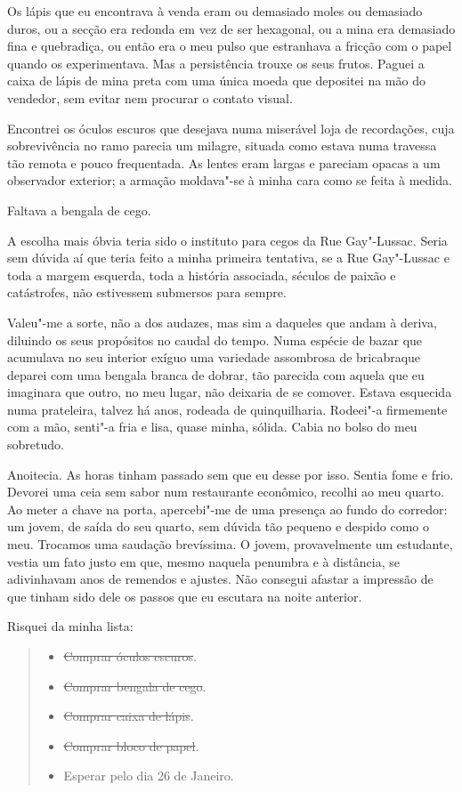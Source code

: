 Os lápis que eu encontrava à venda eram ou demasiado moles ou demasiado
duros, ou a secção era redonda em vez de ser hexagonal, ou a mina era
demasiado fina e quebradiça, ou então era o meu pulso que estranhava a
fricção com o papel quando os experimentava. Mas a persistência trouxe
os seus frutos. Paguei a caixa de lápis de mina preta com uma única
moeda que depositei na mão do vendedor, sem evitar nem procurar o
contato visual.

Encontrei os óculos escuros que desejava numa miserável loja de
recordações, cuja sobrevivência no ramo parecia um milagre, situada como
estava numa travessa tão remota e pouco frequentada. As lentes eram
largas e pareciam opacas a um observador exterior; a armação moldava"-se
à minha cara como se feita à medida.

Faltava a bengala de cego.

A escolha mais óbvia teria sido o instituto para cegos da Rue
Gay"-Lussac. Seria sem dúvida aí que teria feito a minha primeira
tentativa, se a Rue Gay"-Lussac e toda a margem esquerda, toda a história
associada, séculos de paixão e catástrofes, não estivessem submersos
para sempre.

Valeu"-me a sorte, não a dos audazes, mas sim a daqueles que andam à
deriva, diluindo os seus propósitos no caudal do tempo. Numa espécie de
bazar que acumulava no seu interior exíguo uma variedade assombrosa de
bricabraque deparei com uma bengala branca de dobrar, tão parecida com
aquela
que eu imaginara que outro, no meu lugar, não deixaria de se comover.
Estava esquecida numa prateleira, talvez há anos, rodeada de
quinquilharia. Rodeei"-a firmemente com a mão, senti"-a fria e lisa, quase
minha, sólida. Cabia no bolso do meu sobretudo.

Anoitecia. As horas tinham passado sem que eu desse por isso. Sentia
fome e frio. Devorei uma ceia sem sabor num restaurante econômico,
recolhi ao meu quarto. Ao meter a chave na porta, apercebi"-me de uma
presença ao fundo do corredor: um jovem, de saída do seu quarto, sem
dúvida tão pequeno e despido como o meu. Trocamos uma saudação
brevíssima. O jovem, provavelmente um estudante, vestia um fato justo em
que, mesmo naquela penumbra e à distância, se adivinhavam anos de
remendos e ajustes. Não consegui afastar a impressão de que tinham sido
dele os passos que eu escutara na noite anterior.

Risquei da minha lista:

\begin{quote}
\begin{itemize}
\item{}\sout{Comprar óculos escuros}.
\item{}\sout{Comprar bengala de cego}.
\item{}\sout{Comprar caixa de lápis}.
\item{}\sout{Comprar bloco de papel}.
\item{}Esperar pelo dia 26 de Janeiro.
\end{itemize}
\end{quote}

